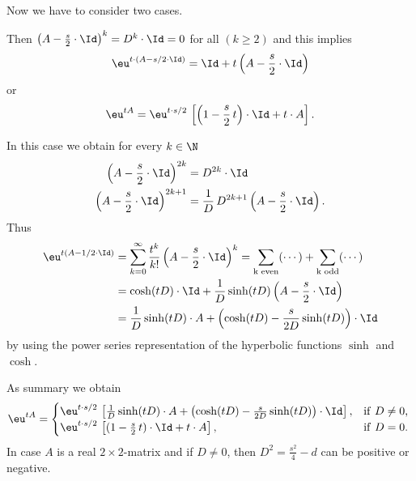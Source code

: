 Now we have to consider two cases.
\begin{description}[wide, labelindent=0em]

\item[$ D^{2} = 0 $: ] 
Then $\left( A - \frac{s}{2}  \cdot \Id \right)^{k} = D^{k} \cdot \Id = 0 $  for all $ (k \geq 2)$ and this implies 
%
\[
	  \eu^{t \cdot \left( A - s/2  \cdot \Id \right)} = \Id + t \left(  A - \frac{s}{2}  \cdot \Id \right)
\]
%
or
%
\[
	 \eu^{t A } =  \eu^{t\cdot s/2} \, \left[ \left( 1 - \frac{s}{2} \, t \right )\cdot \Id + t \cdot A \right] .
\]
%
\item[$ D^{2} \neq 0 $: ]
In this case we obtain for every $ k \in \N $
%
\begin{align*}
	\left( A - \frac{s}{2} \cdot \Id \right)^{2k}  &= D^{2k} \cdot \Id \\ 
	\left( A - \frac{s}{2}  \cdot \Id \right)^{2k+1} &=\frac{1}{D} \, D^{2k+1}\left( A - \frac{s}{2} \cdot \Id \right) .
\end{align*}
Thus 
\begin{align*}
	 \eu^{t( A - 1/2  \cdot \Id )} 
		& = \sum_{k=0}^\infty \frac{t^k}{k!}\left( A - \frac{s}{2}  \cdot \Id \right)^k 
		= \sum_{ \text{k even} } (\cdots) + \sum_{ \text{k odd} } (\cdots)  \\
	&= \cosh( t D ) \cdot \Id + \frac{1}{D} \sinh( t D ) \left( A - \frac{s}{2}  \cdot \Id \right) \\
	&= \frac{ 1 }{ D } \sinh( tD )\cdot A + \left( \cosh(tD) - \frac{s}{2D} \sinh(tD) \right) \cdot \Id
\end{align*}
by using the power series representation of the hyperbolic functions $ \sinh $ and $ \cosh $.
\end{description}
As summary we obtain
\begin{equation*}\label{eq:exp-rep}
	 \eu^{tA} =
	\begin{cases}
		 \eu^{t \cdot s/2} \, \left[ \frac{1}{D} \sinh(t D)  \cdot A + 
			\left( \cosh(tD) - \frac{s}{2D} \sinh(tD) \right) \cdot \Id \right], & 
									\text{if\/ $ D \neq 0 $, } \\
		 \eu^{t \cdot s/2} \, \left[ ( 1 - \frac{s}{2} \, t )\cdot \Id + t \cdot A \right], &
									\text{if\/ $ D = 0 $.}
	\end{cases}
\end{equation*}
In case $A$ is a real $2 \times2$-matrix and if\/ $ D \neq 0 $, then 
$ D^{2} = \frac{s^{2}}{4} - d $ can be positive or negative. 
